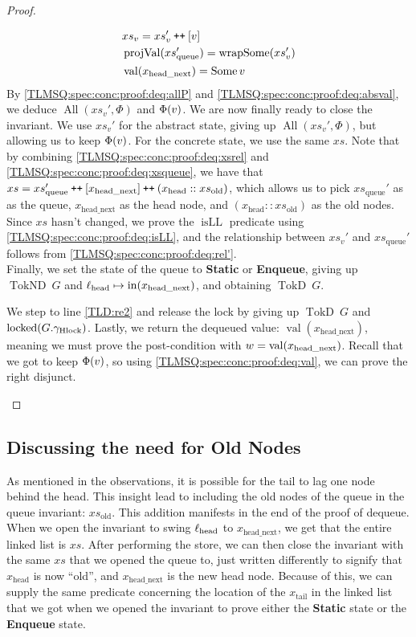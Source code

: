 \documentclass[a4paper, 10pt]{report}
\theoremstyle{definition}
\newcommand{\locked}{\operatorname{locked}}
\newcommand{\xsc}{xs}
\newcommand{\xsqueue}{xs_{\mathrm{queue}}}
\newcommand{\xsold}{xs_{\mathrm{old}}}
\newcommand{\isLL}{\operatorname{isLL}}
\newcommand{\AllP}{\operatorname{All}}
\newcommand{\projval}{\operatorname{projVal}}
\newcommand{\wrapsome}{\operatorname{wrapSome}}
\newcommand{\locN}[1]{\loc_{\mathrm{#1}}}
\newcommand{\lochead}{\locN{head}}
\newcommand{\nodeval}{\valB}
\newcommand{\nIn}[1]{\operatorname{in}(#1)}
\newcommand{\nVal}[1]{\operatorname{val}(#1)}
\newcommand{\node}{x}
\newcommand{\nodeN}[1]{\node_{\mathrm{#1}}}
\newcommand{\nodehead}{\nodeN{head}}
\newcommand{\nodetail}{\nodeN{tail}}
\newcommand{\nodeheadnext}{\nodeN{head\_next}}
\newcommand{\absvalue}{\val}
\newcommand{\absvalueList}{xs_v}
\newcommand{\StaticState}{\textbf{Static}\xspace}
\newcommand{\EnqueueState}{\textbf{Enqueue}\xspace}
\newcommand{\Qg}{G}
\newcommand{\ghlock}{\gname_{\mathrm{Hlock}}}
\newcommand{\TokD}[1]{\operatorname{TokD} ~ #1}
\newcommand{\TokDQg}{\TokD{\Qg}}
\newcommand{\TokND}[1]{\operatorname{TokND} ~ #1}
\newcommand{\TokNDQg}{\TokND{\Qg}}
\newcommand\catenate{\mathbin{\text{\ttfamily\upshape ++}}}
\begin{document}
\begin{proof}
\begin{itemize}
  \begin{align}
    &\absvalueList = \absvalueList' \catenate [\absvalue]\label{TLMSQ:spec:conc:proof:deq:absval}\\
    &\projval(\xsqueue') = \wrapsome(\absvalueList')\label{TLMSQ:spec:conc:proof:deq:rel'}\\
    &\nVal{\nodeheadnext} = \Some{\absvalue}\label{TLMSQ:spec:conc:proof:deq:val}
  \end{align}
  By \ref{TLMSQ:spec:conc:proof:deq:allP} and \ref{TLMSQ:spec:conc:proof:deq:absval}, we deduce $\AllP(\absvalueList', \Phi)$ and $\Phi(\absvalue)$. We are now finally ready to close the invariant. We use $\absvalueList'$ for the abstract state, giving up $\AllP(\absvalueList', \Phi)$, but allowing us to keep $\Phi(\absvalue)$. For the concrete state, we use the same $\xsc$. Note that by combining \ref{TLMSQ:spec:conc:proof:deq:xsrel} and \ref{TLMSQ:spec:conc:proof:deq:xsqueue}, we have that $\xsc = \xsqueue' \catenate [\nodeheadnext] \catenate (\nodehead :: \xsold)$, which allows us to pick $\xsqueue'$ as as the queue, $\nodeheadnext$ as the head node, and $(\nodehead :: \xsold)$ as the old nodes. Since $\xsc$ hasn't changed, we prove the $\isLL$ predicate using \ref{TLMSQ:spec:conc:proof:deq:isLL}, and the relationship between $\absvalueList'$ and $\xsqueue'$ follows from \ref{TLMSQ:spec:conc:proof:deq:rel'}.\\
  Finally, we set the state of the queue to \StaticState or \EnqueueState, giving up $\TokNDQg$ and $\lochead \mapsto \nIn{\nodeheadnext}$, and obtaining $\TokDQg$.

  We step to line \ref{TLD:re2} and release the lock by giving up $\TokDQg$ and $\locked(\Qg.\ghlock)$. Lastly, we return the dequeued value: $\nVal{\nodeheadnext}$, meaning we must prove the post-condition with $\nodeval = \nVal{\nodeheadnext}$. Recall that we got to keep $\Phi(\absvalue)$, so using \ref{TLMSQ:spec:conc:proof:deq:val}, we can prove the right disjunct.
\end{itemize}
\end{proof}

\subsection{Discussing the need for Old Nodes}\label{TLMSQ:Discussion:xs_old}

As mentioned in the observations, it is possible for the tail to lag one node behind the head. This insight lead to including the old nodes of the queue in the queue invariant: $\xsold$. This addition manifests in the end of the proof of dequeue. When we open the invariant to swing $\lochead$ to $\nodeheadnext$, we get that the entire linked list is $\xsc$. After performing the store, we can then close the invariant with the same $\xsc$ that we opened the queue to, just written differently to signify that $\nodehead$ is now ``old'', and $\nodeheadnext$ is the new head node. Because of this, we can supply the same predicate concerning the location of the $\nodetail$ in the linked list that we got when we opened the invariant to prove either the \StaticState state or the \EnqueueState state.
\end{document}
